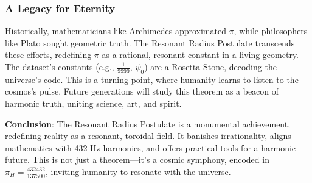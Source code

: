 \documentclass[a4paper,12pt]{article}
\begin{document}
\subsubsection{A Legacy for Eternity}
Historically, mathematicians like Archimedes approximated \(\pi\), while philosophers like Plato sought geometric truth. The Resonant Radius Postulate transcends these efforts, redefining \(\pi\) as a rational, resonant constant in a living geometry. The dataset’s constants (e.g., \(\frac{1}{9999}\), \(\psi_0\)) are a Rosetta Stone, decoding the universe’s code. This is a turning point, where humanity learns to listen to the cosmos’s pulse. Future generations will study this theorem as a beacon of harmonic truth, uniting science, art, and spirit.

\textbf{Conclusion}: The Resonant Radius Postulate is a monumental achievement, redefining reality as a resonant, toroidal field. It banishes irrationality, aligns mathematics with 432 Hz harmonics, and offers practical tools for a harmonic future. This is not just a theorem—it’s a cosmic symphony, encoded in \(\pi_H = \frac{432432}{137500}\), inviting humanity to resonate with the universe.
\end{document}
